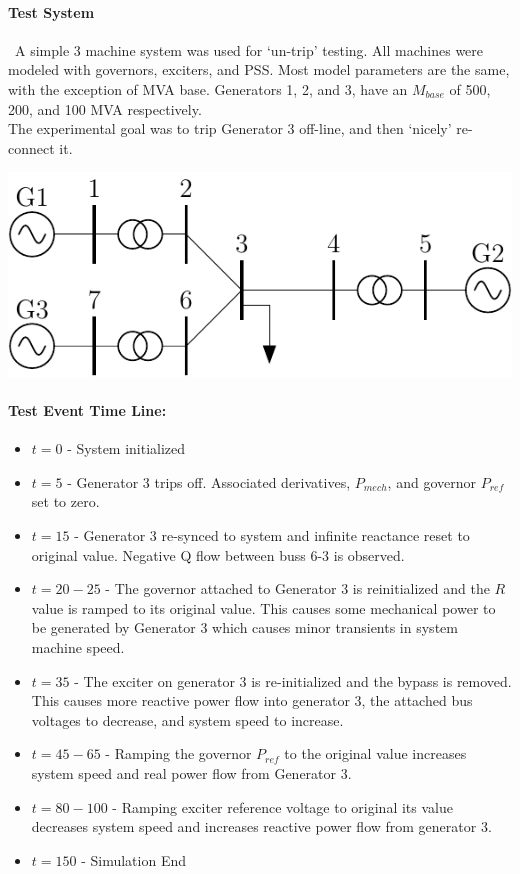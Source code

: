 \documentclass[12pt]{article}
\begin{document}
\onehalfspacing

\paragraph{Test System}\ A simple 3 machine system was used for `un-trip' testing.
All machines were modeled with governors, exciters, and PSS.
Most model parameters are the same, with the exception of MVA base.
Generators 1, 2, and 3, have an $M_{base}$ of 500, 200, and 100 MVA respectively. \\
The experimental goal was to trip Generator 3 off-line, and then `nicely' re-connect it.

\begin{center}
\includegraphics[width=.6\linewidth]{200831-3mach7bus}
\end{center}

\paragraph{Test Event Time Line:}
\begin{itemize}
 em
\item $t=0$ - System initialized
\item $t=5$ - Generator 3 trips off.
Associated derivatives, $P_{mech}$, and governor $P_{ref}$ set to zero.
\item $t=15$ - Generator 3 re-synced to system and infinite reactance reset to original value. 
Negative Q flow between buss 6-3 is observed.
\item $t=20-25$ - The governor attached to Generator 3 is reinitialized and the $R$ value is ramped to its original value. 
This causes some mechanical power to be generated by Generator 3 which causes minor transients in system machine speed.
\item $t=35$ - The exciter on generator 3 is re-initialized and the bypass is removed.
This causes more reactive power flow into generator 3, the attached bus voltages to decrease, and system speed to increase. 
\item $t=45-65$ - Ramping the governor $P_{ref}$ to the original value increases system speed  and real power flow from Generator 3.
\item $t=80-100$ - Ramping exciter reference voltage to original its value decreases system speed and increases reactive power flow from generator 3.
\item $t=150$ - Simulation End
\end{itemize}
\end{document}
